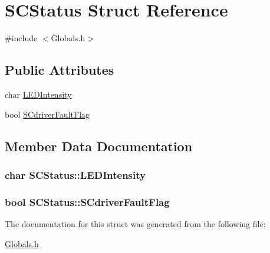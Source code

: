 \hypertarget{structSCStatus}{}\section{S\+C\+Status Struct Reference}
\label{structSCStatus}


{\ttfamily \#include $<$Globals.\+h$>$}

\subsection*{Public Attributes}
\begin{DoxyCompactItemize}
\item 
char \hyperlink{structSCStatus_abb046ef0909fde514e42f8c2396dd4c6}{L\+E\+D\+Intensity}
\item 
bool \hyperlink{structSCStatus_aa2d12cf60ea52e17e2827246821e3af7}{S\+Cdriver\+Fault\+Flag}
\end{DoxyCompactItemize}


\subsection{Member Data Documentation}
\subsubsection[{\texorpdfstring{L\+E\+D\+Intensity}{LEDIntensity}}]{\setlength{\rightskip}{0pt plus 5cm}char S\+C\+Status\+::\+L\+E\+D\+Intensity}\hypertarget{structSCStatus_abb046ef0909fde514e42f8c2396dd4c6}{}\label{structSCStatus_abb046ef0909fde514e42f8c2396dd4c6}
\subsubsection[{\texorpdfstring{S\+Cdriver\+Fault\+Flag}{SCdriverFaultFlag}}]{\setlength{\rightskip}{0pt plus 5cm}bool S\+C\+Status\+::\+S\+Cdriver\+Fault\+Flag}\hypertarget{structSCStatus_aa2d12cf60ea52e17e2827246821e3af7}{}\label{structSCStatus_aa2d12cf60ea52e17e2827246821e3af7}


The documentation for this struct was generated from the following file\+:\begin{DoxyCompactItemize}
\item 
\hyperlink{Globals_8h}{Globals.\+h}\end{DoxyCompactItemize}
